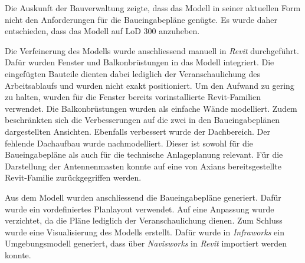 \begin{German}
    Die Auskunft der Bauverwaltung zeigte, dass das Modell in seiner aktuellen Form nicht den Anforderungen für die Baueingabepläne genügte. Es wurde daher entschieden, dass das Modell auf LoD 300 anzuheben.
    
    Die Verfeinerung des Modells wurde anschliessend manuell in \textit{Revit} durchgeführt. Dafür wurden Fenster und Balkonbrüstungen in das Modell integriert. Die eingefügten Bauteile dienten dabei lediglich der Veranschaulichung des Arbeitsablaufs und wurden nicht exakt positioniert. Um den Aufwand zu gering zu halten, wurden für die Fenster bereits vorinstallierte Revit-Familien verwendet. Die Balkonbrüstungen wurden als einfache Wände modelliert. Zudem beschränkten sich die Verbesserungen auf die zwei in den Baueingabeplänen dargestellten Ansichten. 
    Ebenfalls verbessert wurde der Dachbereich. Der fehlende Dachaufbau wurde nachmodelliert. Dieser ist sowohl für die Baueingabepläne als auch für die technische Anlageplanung relevant. Für die Darstellung der Antennenmasten konnte auf eine von Axians bereitsgestellte Revit-Familie zurückgegriffen werden.

    Aus dem Modell wurden anschliessend die Baueingabepläne generiert. Dafür wurde ein vordefiniertes Planlayout verwendet. Auf eine Anpassung wurde verzichtet, da die Pläne lediglich der Veranschaulichung dienen. Zum Schluss wurde eine Visualisierung des Modells erstellt. Dafür wurde in \textit{Infraworks} ein Umgebungsmodell generiert, dass über \textit{Navisworks} in \textit{Revit} importiert werden konnte.    
\end{German}

